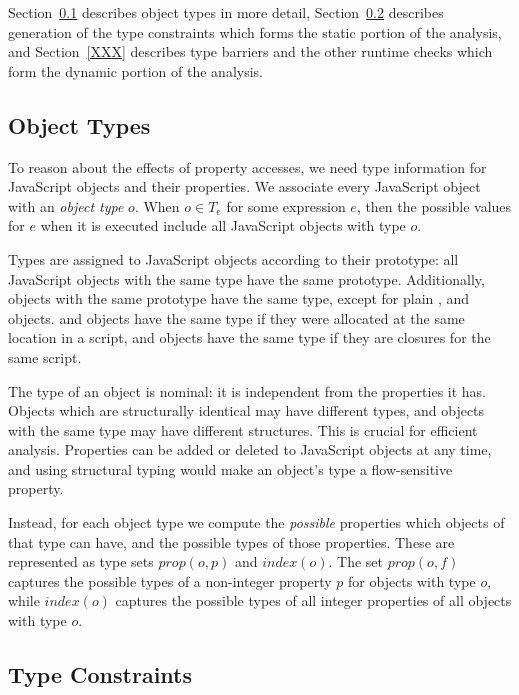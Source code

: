 Section~\ref{sec:object-types} describes object types in more detail,
Section~\ref{sec:constraints} describes generation of the type constraints
which forms the static portion of the analysis, and Section~\ref{XXX}
describes type barriers and the other runtime checks which form the dynamic
portion of the analysis.

\subsection{Object Types}
\label{sec:object-types}

To reason about the effects of property accesses, we need type information
for JavaScript objects and their properties.
We associate every JavaScript object with an {\it object type} $o$.
When $o \in T_e$ for some expression $e$, then the possible values
for $e$ when it is executed include all JavaScript objects with type $o$.

Types are assigned to JavaScript objects according to their prototype:
all JavaScript objects with the same type have the same prototype.
Additionally, objects with the same prototype have the same type,
except for plain ,  and  objects.
 and  objects have the same type if they were
allocated at the same location in a script,
and  objects have the same type if they are closures
for the same script.

The type of an object is nominal: it is independent from the properties it
has. Objects which are structurally identical may have different types, and
objects with the same type may have different structures. This is crucial for
efficient analysis. Properties can be added or deleted to JavaScript objects
at any time, and using structural typing would make an object's type a
flow-sensitive property.

Instead, for each object type we compute the {\it possible} properties
which objects of that type can have, and the possible types of those
properties.
These are represented as type sets $prop(o,p)$ and $index(o)$.
The set $prop(o,f)$ captures the possible types of a non-integer property
$p$ for objects with type $o$, while $index(o)$ captures the possible
types of all integer properties of all objects with type $o$.

\subsection{Type Constraints}
\label{sec:constraints}

